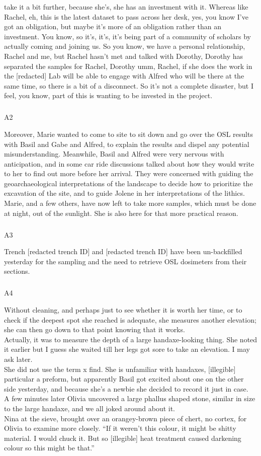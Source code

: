 \documentclass[
  canadian,
]{article}
\makeatletter
\let\oldsubparagraph\subparagraph
\renewcommand{\subparagraph}{
    \@ifstar
      \xxxSubParagraphStar
      \xxxSubParagraphNoStar
  }
\newcommand{\xxxSubParagraphStar}[1]{\oldsubparagraph*{#1}\mbox{}}
\newcommand{\xxxSubParagraphNoStar}[1]{\oldsubparagraph{#1}\mbox{}}
\makeatother
\begin{document}
take it a bit further, because she's, she has an investment with it.
Whereas like Rachel, eh, this is the latest dataset to pass across her
desk, yes, you know I've got an obligation, but maybe it's more of an
obligation rather than an investment. You know, so it's, it's, it's
being part of a community of scholars by actually coming and joining us.
So you know, we have a personal relationship, Rachel and me, but Rachel
hasn't met and talked with Dorothy, Dorothy has separated the samples
for Rachel, Dorothy umm, Rachel, if she does the work in the
{[}redacted{]} Lab will be able to engage with Alfred who will be there
at the same time, so there is a bit of a disconnect. So it's not a
complete disaster, but I feel, you know, part of this is wanting to be
invested in the project.

\subparagraph{A2}\label{sec-A2}

Moreover, Marie wanted to come to site to sit down and go over the OSL
results with Basil and Gabe and Alfred, to explain the results and
dispel any potential misunderstanding. Meanwhile, Basil and Alfred were
very nervous with anticipation, and in some car ride discussions talked
about how they would write to her to find out more before her arrival.
They were concerned with guiding the geoarchaeological interpretations
of the landscape to decide how to prioritize the excavation of the site,
and to guide Jolene in her interpretations of the lithics.\\
Marie, and a few others, have now left to take more samples, which must
be done at night, out of the sunlight. She is also here for that more
practical reason.

\subparagraph{A3}\label{sec-A3}

Trench {[}redacted trench ID{]} and {[}redacted trench ID{]} have been
un-backfilled yesterday for the sampling and the need to retrieve OSL
dosimeters from their sections.

\subparagraph{A4}\label{sec-A4}

Without cleaning, and perhaps just to see whether it is worth her time,
or to check if the deepest spot she reached is adequate, she measures
another elevation; she can then go down to that point knowing that it
works.\\
Actually, it was to measure the depth of a large handaxe-looking thing.
She noted it earlier but I guess she waited till her legs got sore to
take an elevation. I may ask later.\\
She did not use the term x find. She is unfamiliar with handaxes,
{[}illegible{]} particular a preform, but apparently Basil got excited
about one on the other side yesterday, and because she's a newbie she
decided to record it just in case.\\
A few minutes later Olivia uncovered a large phallus shaped stone,
similar in size to the large handaxe, and we all joked around about
it.\\
Nina at the sieve, brought over an orangey-brown piece of chert, no
cortex, for Olivia to examine more closely. ``If it weren't this colour,
it might be shitty material. I would chuck it. But so {[}illegible{]}
heat treatment caused darkening colour so this might be that.''
\end{document}
